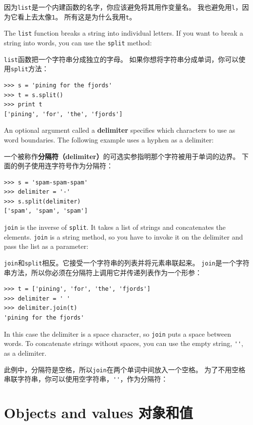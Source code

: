 \documentclass[10pt]{book}
\begin{document}
\begin{CJK}{UTF8}{gbsn}
因为{\tt list}是一个内建函数的名字，你应该避免将其用作变量名。
我也避免用{\tt l}，因为它看上去太像{\tt 1}。
所有这是为什么我用{\tt t}。

The {\tt list} function breaks a string into individual letters.  If
you want to break a string into words, you can use the {\tt split}
method:

{\tt list}函数把一个字符串分成独立的字母。
如果你想将字符串分成单词，你可以使用{\tt split}方法：

\begin{verbatim}
>>> s = 'pining for the fjords'
>>> t = s.split()
>>> print t
['pining', 'for', 'the', 'fjords']
\end{verbatim}
%
An optional argument called a {\bf delimiter} specifies which
characters to use as word boundaries.
The following example
uses a hyphen as a delimiter:

一个被称作{\bf 分隔符（delimiter）}的可选实参指明那个字符被用于单词的边界。
下面的例子使用连字符号作为分隔符：

\begin{verbatim}
>>> s = 'spam-spam-spam'
>>> delimiter = '-'
>>> s.split(delimiter)
['spam', 'spam', 'spam']
\end{verbatim}
%
{\tt join} is the inverse of {\tt split}.  It
takes a list of strings and
concatenates the elements.  {\tt join} is a string method,
so you have to invoke it on the delimiter and pass the
list as a parameter:

{\tt join}和{\tt split}相反。它接受一个字符串的列表并将元素串联起来。
{\tt join}是一个字符串方法，所以你必须在分隔符上调用它并传递列表作为一个形参：

\begin{verbatim}
>>> t = ['pining', 'for', 'the', 'fjords']
>>> delimiter = ' '
>>> delimiter.join(t)
'pining for the fjords'
\end{verbatim}
%
In this case the delimiter is a space character, so
{\tt join} puts a space between words.  To concatenate
strings without spaces, you can use the empty string,
\verb"''", as a delimiter. 

此例中，分隔符是空格，所以{\tt join}在两个单词中间放入一个空格。
为了不用空格串联字符串，你可以使用空字符串，\verb"''"，作为分隔符：


\section{Objects and values 对象和值}


\end{CJK}
\end{document}
